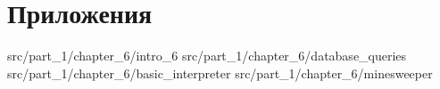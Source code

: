 \chapter{Приложения}

 {src/part_1/chapter_6/intro_6}
 {src/part_1/chapter_6/database_queries}
 {src/part_1/chapter_6/basic_interpreter}
 {src/part_1/chapter_6/minesweeper}